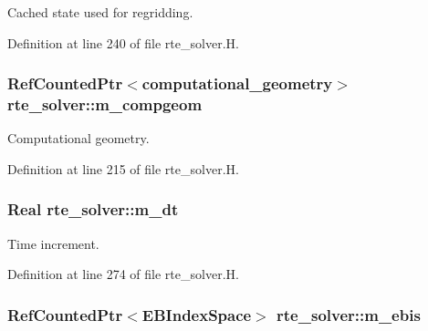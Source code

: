 Cached state used for regridding. 



Definition at line 240 of file rte\+\_\+solver.\+H.

\subsubsection[{\texorpdfstring{m\+\_\+compgeom}{m_compgeom}}]{\setlength{\rightskip}{0pt plus 5cm}Ref\+Counted\+Ptr$<${\bf computational\+\_\+geometry}$>$ rte\+\_\+solver\+::m\+\_\+compgeom\hspace{0.3cm}{\ttfamily [protected]}}\hypertarget{classrte__solver_adab5bbc90842bd7625e85f9bab4c8a99}{}\label{classrte__solver_adab5bbc90842bd7625e85f9bab4c8a99}


Computational geometry. 



Definition at line 215 of file rte\+\_\+solver.\+H.

\subsubsection[{\texorpdfstring{m\+\_\+dt}{m_dt}}]{\setlength{\rightskip}{0pt plus 5cm}Real rte\+\_\+solver\+::m\+\_\+dt\hspace{0.3cm}{\ttfamily [protected]}}\hypertarget{classrte__solver_a80b5c9a5be3629ebcff3e30c9b3af3e9}{}\label{classrte__solver_a80b5c9a5be3629ebcff3e30c9b3af3e9}


Time increment. 



Definition at line 274 of file rte\+\_\+solver.\+H.

\subsubsection[{\texorpdfstring{m\+\_\+ebis}{m_ebis}}]{\setlength{\rightskip}{0pt plus 5cm}Ref\+Counted\+Ptr$<$E\+B\+Index\+Space$>$ rte\+\_\+solver\+::m\+\_\+ebis\hspace{0.3cm}{\ttfamily [protected]}}\hypertarget{classrte__solver_a3f5fa6388034fcf229f3a0b347a4fd54}{}\label{classrte__solver_a3f5fa6388034fcf229f3a0b347a4fd54}


